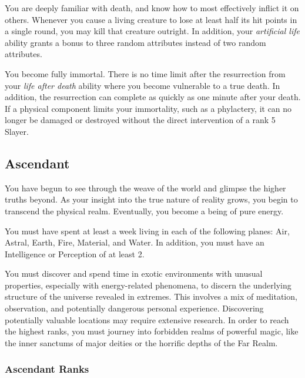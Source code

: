              You are deeply familiar with death, and know how to most effectively inflict it on others.
            Whenever you cause a living creature to lose at least half its hit points in a single round, you may kill that creature outright.
            In addition, your \textit{artificial life} ability grants a bonus to three random attributes instead of two random attributes.

             You become fully immortal. There is no time limit after the resurrection from your \textit{life after death} ability where you become vulnerable to a true death. In addition, the resurrection can complete as quickly as one minute after your death. If a physical component limits your immortality, such as a phylactery, it can no longer be damaged or destroyed without the direct intervention of a rank 5 Slayer.

    \subsection{Ascendant}
        You have begun to see through the weave of the world and glimpse the higher truths beyond.
        As your insight into the true nature of reality grows, you begin to transcend the physical realm.
        Eventually, you become a being of pure energy.

         You must have spent at least a week living in each of the following planes: Air, Astral, Earth, Fire, Material, and Water.
        In addition, you must have an Intelligence or Perception of at least 2.

         You must discover and spend time in exotic environments with unusual properties, especially with energy-related phenomena, to discern the underlying structure of the universe revealed in extremes.
        This involves a mix of meditation, observation, and potentially dangerous personal experience.
        Discovering potentially valuable locations may require extensive research.
        In order to reach the highest ranks, you must journey into forbidden realms of powerful magic, like the inner sanctums of major deities or the horrific depths of the Far Realm.

        \subsubsection{Ascendant Ranks}

